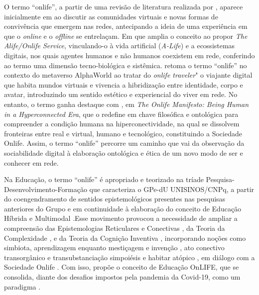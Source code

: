 \documentclass[portuguese]{textolivre}
\begin{document}
O termo “onlife”, a partir de uma revisão de literatura realizada por \textcite{schlemmer2024inteligencias}, aparece inicialmente em \textcite{rheingold1993virtualcommunity} ao discutir as comunidades virtuais e novas formas de convivência que emergem nas redes, antecipando a ideia de uma experiência em que o \textit{online} e o \textit{offline} se entrelaçam. Em \textcite{gutowitz1995alifeonlife} que amplia o conceito ao propor \textit{The Alife/Onlife Service}, vinculando-o à vida artificial (\textit{A-Life}) e a ecossistemas digitais, nos quais agentes humanos e não humanos coexistem em rede, conferindo ao termo uma dimensão tecno-biológica e sistêmica. \textcite{becker2000onlifetraveler} retoma o termo “onlife” no contexto do metaverso AlphaWorld ao tratar do \textit{onlife traveler}" o viajante digital que habita mundos virtuais e vivencia a hibridização entre identidade, corpo e avatar, introduzindo um sentido estético e experiencial do viver em rede. No entanto, o termo ganha destaque com \textcite{floridi2015onlife}, em \textit{The Onlife Manifesto: Being Human in a Hyperconnected Era}, que o redefine em chave filosófica e ontológica para compreender a condição humana na hiperconectividade, na qual se dissolvem fronteiras entre real e virtual, humano e tecnológico, constituindo a Sociedade Onlife. Assim, o termo “onlife” percorre um caminho que vai da observação da sociabilidade digital à elaboração ontológica e ética de um novo modo de ser e conhecer em rede.

Na Educação, o termo “onlife” é apropriado e teorizado na tríade Pesquisa-Desenvolvimento-Formação que caracteriza o GPe-dU UNISINOS/CNPq, a partir do coengendramento de sentidos epistemológicos presentes nas pesquisas anteriores do Grupo e em continuidade à elaboração do conceito de Educação Híbrida e Multimodal \cite{schlemmer2016agamificacao,schlemmer2016bgames,schlemmer2016chibridismo}.Esse movimento provocou a necessidade de ampliar a compreensão das Epistemologias Reticulares e Conectivas \cite{difelice2012redessociais}, da Teoria da Complexidade \cite{morin2011setesaberes}, e da Teoria da Cognição Inventiva \cite{kastrup2015cognicao}, incorporando noções como simbiota, aprendizagem enquanto mestiçagem e invenção \cite{serres1993filosofiamestica}, ato conectivo transorgânico e transubstanciação \cite{difelice2017netativismo} simpoiésis \cite{haraway2016staying} e habitar atópico \cite{difelice2009paisagensposurbanas}, em diálogo com a Sociedade Onlife \cite{floridi2015onlife}. Com isso, propõe o conceito de Educação OnLIFE, que se consolida, diante dos desafios impostos pela pandemia da Covid-19, como um paradigma \cite{moreira2020educacaodigital,schlemmer2020ampliando,schlemmer2020onlife}.
\end{document}
